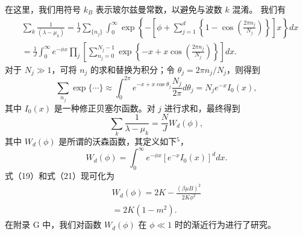 在这里，我们用符号 \(k_{B}\) 表示玻尔兹曼常数，以避免与波数 \(k\) 混淆。
我们有
\begin{equation}\tag{13.4.58}\label{eq:13.4.58}
\begin{array}{rl} & { \sum _ { k } \frac { 1 } { ( \lambda - \mu _ { k } ) } = \frac { 1 } { J } \sum _ { \{ n _ { j } \} } \int _ { 0 } ^{\infty} \exp \left\{ - \left[ \phi + \sum _ { j = 1 } ^{d} \left\{ 1 - \cos \left( \frac { 2 \pi n _ { j } } { N _ { j } } \right) \right\} \right] x \right\} d x } \\& { = \frac { 1 } { J } \int _ { 0 } ^{\infty} e ^{- \phi x} \prod _ { j } \left[ \sum _ { n _ { j } = 0 } ^{N _ { j} - 1 } \exp \left\{ - x + x \cos \left( \frac { 2 \pi n _ { j } } { N _ { j } } \right) \right\} \right] d x . } \end{array}
\end{equation}
对于 \(N_j \gg 1\)，可将 \(n_j\) 的求和替换为积分；令 \(\theta_j = 2\pi n_j/N_j\)，则得到
\begin{equation}\tag{13.4.59}\label{eq:13.4.59}
\sum _ { n _ { j } } \exp \{ \cdots \} \approx \int _ { 0 } ^{2 \pi} e ^{- x + x \cos \theta _ { j} } \frac { N _ { j } } { 2 \pi } d \theta _ { j } = N _ { j } e ^{- x} I _ { 0 } ( x ) ,
\end{equation}
其中 \(I_{0}(x)\) 是一种修正贝塞尔函数。对 \(j\) 进行求和，最终得到
\begin{equation}\tag{13.4.60}\label{eq:13.4.60}
\sum _ { k } \frac { 1 } { \lambda - \mu _ { k } } = \frac { N } { J } W _ { d } ( \phi ) ,
\end{equation}
其中 \(W_{d}(\phi)\) 是所谓的沃森函数，其定义如下\(^{5}\)，
\begin{equation}\tag{13.4.61}\label{eq:13.4.61}
W _ { d } ( \phi ) = \int _ { 0 } ^{\infty} e ^{- \phi x} [ e ^{- x} I _ { 0 } ( x ) ] ^{d} d x .
\end{equation}
式（19）和式（21）现可化为
\begin{equation}\tag{13.4.62}\label{eq:13.4.62}
\begin{array}{r} { W _ { d } ( \phi ) = 2 K - \frac { ( \beta \mu B ) ^{2} } { 2 K \phi ^{2} } } \\{ = 2 K ( 1 - m ^{2} ) . } \end{array}
\end{equation}
在附录 G 中，我们对函数 \(W_{d}(\phi)\) 在 \(\phi \ll 1\) 时的渐近行为进行了研究。
